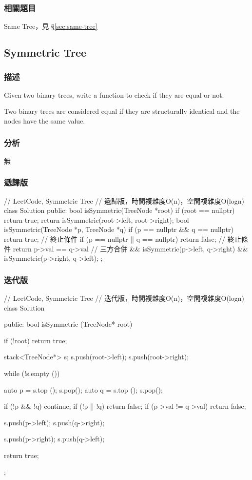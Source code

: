 \subsubsection{相關題目}
\begindot
\item Same Tree，見 \S \ref{sec:same-tree}
\myenddot


\subsection{Symmetric Tree}
\label{sec:symmetric-tree}


\subsubsection{描述}
Given two binary trees, write a function to check if they are equal or not.

Two binary trees are considered equal if they are structurally identical and the nodes have the same value.


\subsubsection{分析}
無


\subsubsection{遞歸版}
\begin{Code}
// LeetCode, Symmetric Tree
// 遞歸版，時間複雜度O(n)，空間複雜度O(logn)
class Solution {
public:
    bool isSymmetric(TreeNode *root) {
        if (root == nullptr) return true;
        return isSymmetric(root->left, root->right);
    }
    bool isSymmetric(TreeNode *p, TreeNode *q) {
        if (p == nullptr && q == nullptr) return true;   // 終止條件
        if (p == nullptr || q == nullptr) return false;  // 終止條件
        return p->val == q->val      // 三方合併
                && isSymmetric(p->left, q->right)
                && isSymmetric(p->right, q->left);
    }
};
\end{Code}


\subsubsection{迭代版}
\begin{Code}
// LeetCode, Symmetric Tree
// 迭代版，時間複雜度O(n)，空間複雜度O(logn)
class Solution {
public:
    bool isSymmetric (TreeNode* root) {
        if (!root) return true;

        stack<TreeNode*> s;
        s.push(root->left);
        s.push(root->right);

        while (!s.empty ()) {
            auto p = s.top (); s.pop();
            auto q = s.top (); s.pop();

            if (!p && !q) continue;
            if (!p || !q) return false;
            if (p->val != q->val) return false;

            s.push(p->left);
            s.push(q->right);

            s.push(p->right);
            s.push(q->left);
        }

        return true;
    }
};
\end{Code}


